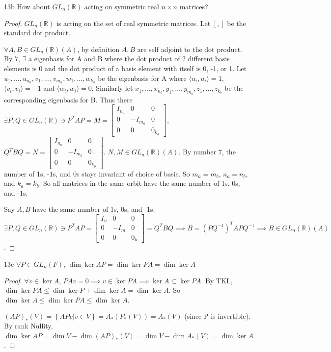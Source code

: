 \documentclass{article}
\newcommand{\R}{\mathbb{R}}
\newcommand{\angles}[1]{\langle #1 \rangle}
\begin{document}
\begin{PROB}{13b}\label{Problem 13b.}
    How about $GL_n(\R)$ acting on symmetric real $n \times n$ matrices?
\end{PROB}
\begin{proof}
    $GL_n(\R)$ is acting on the set of real symmetric matrices. Let $[ , ]$ be the standard dot product. 

    $\forall A, B \in GL_n(\R)(A)$, by definition $A, B$ are self adjoint to the dot product. By 7, $\exists$ a eigenbasis for A and B where the dot product of 2 different basis elements is 0 and the dot product of a basis element with itself is 0, -1, or 1. Let $u_1, \dots, u_{n_a}, v_1, \dots, v_{m_a}, w_1, \dots, w_{k_a}$ be the eigenbasis for A where $\angles{u_i, u_i} = 1$, $\angles{v_i, v_i} = -1$ and $\angles{w_i, w_i} = 0$. Similarly let $x_1, \dots, x_{n_b}, y_1, \dots, y_{m_b}, z_1, \dots, z_{k_b}$ be the corresponding eigenbasis for B. Thus there $\exists P, Q \in GL_n(\R) \ni P^T A P = M = \begin{bmatrix}
        I_{n_a} & 0 & 0 \\ 0 & -I_{m_a} & 0 \\ 0 & 0 & 0_{k_a}
    \end{bmatrix},$ 
    $Q^T B Q = N = \begin{bmatrix}
        I_{n_b} & 0 & 0 \\ 0 & -I_{m_b} & 0 \\ 0 & 0 & 0_{k_b}
    \end{bmatrix}$. $N, M  \in GL_n(\R)(A)$. By number 7, the number of 1s, -1s, and 0s stays invariant of choice of basis. So $m_a = m_b$, $n_a = n_b$, and $k_a = k_b$. So all matrices in the same orbit have the same number of 1s, 0s, and -1s. 

    Say $A, B$ have the same number of 1s, 0s, and -1s. $\exists P, Q \in GL_n(\R) \ni P^T A P = \begin{bmatrix}
        I_{n} & 0 & 0 \\ 0 & -I_{m} & 0 \\ 0 & 0 & 0_{k}
    \end{bmatrix} = Q^T B Q \implies B = (PQ^{-1})^T A PQ^{-1} \implies B \in GL_n(\R)(A)$.   
\end{proof}

\begin{claim}{13c}\label{Claim 13c.}
    $\forall P \in GL_n(F)$, $\dim \ker AP = \dim \ker PA = \dim \ker A$  
\end{claim}
\begin{proof}
    $\forall v \in \ker A$, $PAv = 0 \implies v \in \ker PA \implies \ker A \subset \ker PA$. By TKL, $\dim \ker P A \leq \dim \ker P + \dim \ker A = \dim \ker A$. So $\dim \ker A \leq \dim \ker PA \leq \dim \ker A$. 
    
    $(AP)_*(V) = \left\{ APv | v \in V \right\} = A_*(P_*(V)) = A_*(V)$ (since P is invertible). By rank Nullity, $\dim \ker AP = \dim V - \dim (AP)_*(V) = \dim V - \dim A_*(V) = \dim \ker A$. 
    
\end{proof}
\end{document}
